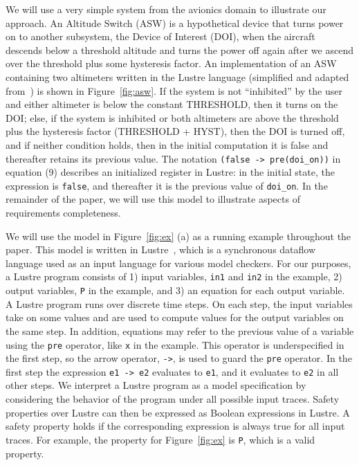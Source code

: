 We will use a very simple system from the avionics domain to illustrate our approach. An Altitude Switch (ASW) is a hypothetical device that turns power on to another subsystem, the Device of Interest (DOI), when the aircraft descends below a threshold altitude and turns the power off again after we ascend over the threshold plus some hysteresis factor.  An implementation of an ASW containing two altimeters written in the Lustre language (simplified and adapted from~\cite{HCW02:ase-deviation}) is shown in Figure~\ref{fig:asw}.  If the system is not ``inhibited'' by the user and either altimeter is below the constant THRESHOLD, then it turns on the DOI; else, if the system is inhibited or both altimeters are above the threshold plus the hysteresis factor (THRESHOLD + HYST), then the DOI is turned off, and if neither condition holds, then in the initial computation it is false and thereafter retains its previous value.  The notation \texttt{(false -> pre(doi\_on))} in equation (9) describes an initialized register in Lustre: in the initial state, the expression is \texttt{false}, and thereafter it is the previous value of \texttt{doi\_on}.  In the remainder of the paper, we will use this model to illustrate aspects of requirements completeness.  %


\iffalse
{}

We will use the model in Figure~\ref{fig:ex} (a) as
a running example throughout the paper. This model is written in Lustre~\cite{Halbwachs91:lustre}, which is a synchronous dataflow language used as an input language for various model checkers. For our purposes, a Lustre program
consists of 1) input variables, {\tt in1} and {\tt in2} in the example, 2) output
variables, {\tt P} in the example, and 3) an
equation for each output variable. A Lustre program runs over discrete
time steps. On each step, the input variables take on some values and
are used to compute values for the output variables on the same step.
In addition, equations may refer to the previous value of a variable
using the {\tt pre} operator, like {\tt x} in the example. This operator is underspecified in the
first step, so the arrow operator, {\tt ->}, is used to guard the
{\tt pre} operator. In the first step the expression {\tt e1 -> e2}
evaluates to {\tt e1}, and it evaluates to {\tt e2} in all other steps. We interpret a Lustre program as a model specification by considering
the behavior of the program under all possible input traces. Safety
properties over Lustre can then be expressed as Boolean expressions in
Lustre. A safety property holds if the corresponding expression is
always true for all input traces. For example, the property for
Figure~\ref{fig:ex} is {\tt P}, which is a valid property.

